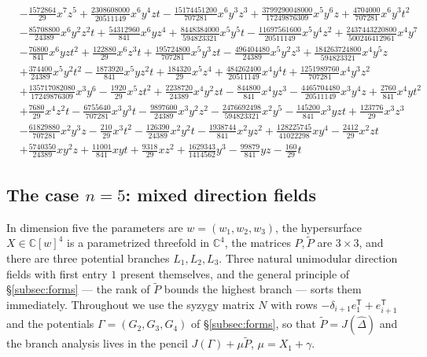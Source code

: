 \documentclass[11pt]{article}
\numberwithin{equation}{section}
\theoremstyle{plain}
\theoremstyle{definition}
\theoremstyle{remark}
\newcommand{\C}{\mathbb{C}}
\begin{document}
{\begin{align*}
&-\tfrac{1572864}{29}x^7z^5+\tfrac{2308608000}{20511149}x^6y^4zt-\tfrac{15174451200}{707281}x^6y^3z^3+\tfrac{3799290048000}{17249876309}x^5y^6z+\tfrac{4704000}{707281}x^6y^3t^2\\
&-\tfrac{85708800}{24389}x^6y^2z^2t+\tfrac{54312960}{841}x^6yz^4+\tfrac{8448384000}{594823321}x^5y^5t-\tfrac{11697561600}{20511149}x^5y^4z^2+\tfrac{2437443220800}{500246412961}x^4y^7\\
&-\tfrac{76800}{841}x^6yzt^2+\tfrac{122880}{29}x^6z^3t+\tfrac{195724800}{707281}x^5y^3zt-\tfrac{496404480}{24389}x^5y^2z^3+\tfrac{184263724800}{594823321}x^4y^5z\\
&+\tfrac{374400}{24389}x^5y^2t^2-\tfrac{1873920}{841}x^5yz^2t+\tfrac{184320}{29}x^5z^4+\tfrac{484262400}{20511149}x^4y^4t+\tfrac{1251989760}{707281}x^4y^3z^2\\
&+\tfrac{135717082080}{17249876309}x^3y^6-\tfrac{1920}{29}x^5zt^2+\tfrac{2238720}{24389}x^4y^2zt-\tfrac{844800}{841}x^4yz^3-\tfrac{4465704480}{20511149}x^3y^4z+\tfrac{2760}{841}x^4yt^2\\
&+\tfrac{7680}{29}x^4z^2t-\tfrac{6755640}{707281}x^3y^3t-\tfrac{9897600}{24389}x^3y^2z^2-\tfrac{2476692498}{594823321}x^2y^5-\tfrac{145200}{841}x^3yzt+\tfrac{123776}{29}x^3z^3\\
&-\tfrac{61829880}{707281}x^2y^3z-\tfrac{210}{29}x^3t^2-\tfrac{126390}{24389}x^2y^2t-\tfrac{1938744}{841}x^2yz^2+\tfrac{128225745}{41022298}xy^4-\tfrac{2412}{29}x^2zt\\
&+\tfrac{5740350}{24389}xy^2z+\tfrac{11001}{841}xyt+\tfrac{9318}{29}xz^2+\tfrac{1629343}{1414562}y^3-\tfrac{99879}{841}yz-\tfrac{160}{29}t
\end{align*}
}

\subsection{The case \texorpdfstring{$n=5$}{n=5}: mixed direction fields}\label{subsec:n5}

In dimension five the parameters are $w=(w_1,w_2,w_3)$, the hypersurface
$X\in\C[w]^4$ is a parametrized threefold in $\C^4$, the matrices
$P,\widetilde P$ are $3\times3$, and there are three potential branches
$L_1,L_2,L_3$. Three natural unimodular direction fields with first entry $1$
present themselves, and the general principle of \S\ref{subsec:forms} --- the
rank of $\widetilde P$ bounds the highest branch --- sorts them immediately.
Throughout we use the syzygy matrix $N$ with rows
$-\delta_{i+1}e_1^{\mathsf T}+e_{i+1}^{\mathsf T}$ and the potentials
$\Gamma=(G_2,G_3,G_4)$ of \S\ref{subsec:forms}, so that
$\widetilde P=J(\widehat\Delta)$ and the branch analysis lives in the pencil
$J(\Gamma)+\mu\widetilde P$, $\mu=X_1+\gamma$.
\end{document}
